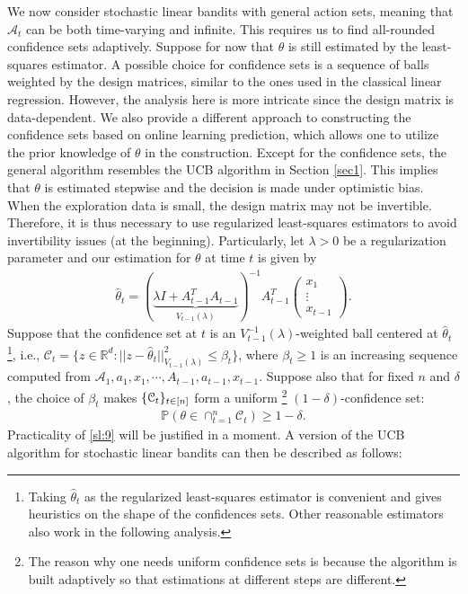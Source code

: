 \documentclass[letterpaper,11pt,openright,openany]{book}
\numberwithin{equation}{section}
\theoremstyle{plain}
\theoremstyle{definition}
\def\R{{\mathbb R}}
\def\R{{\mathbb R}}
\def\P{{\mathbb P}}
\def\t{{\theta}}
\begin{document}
We now consider stochastic linear bandits with general action sets, meaning that $\mathcal A_t$ can be both time-varying and infinite.
This requires us to find all-rounded confidence sets adaptively.  
Suppose for now that $\t$ is still estimated by the least-squares estimator. 
A possible choice for confidence sets is a sequence of balls weighted by the design matrices, similar to the ones used in the classical linear regression.
However, the analysis here is more intricate since the design matrix is data-dependent.  
We also provide a different approach to constructing the confidence sets based on online learning prediction, which allows one to utilize the prior knowledge of $\t$ in the construction. 
Except for the confidence sets, the general algorithm resembles the UCB algorithm in Section \ref{sec1}. 
This implies that $\t$ is estimated stepwise and the decision is made under optimistic bias. 
When the exploration data is small, the design matrix may not be invertible.  
Therefore, it is thus necessary to use regularized least-squares estimators to avoid invertibility issues (at the beginning). Particularly, let $\lambda>0$ be a regularization parameter and our estimation for $\t$ at time $t$ is given by 
\begin{align}\label{est}
\hat{\t}_t = (\underbrace{\lambda I +A^T_{t-1}A_{t-1}}_{V_{t-1}(\lambda)})^{-1}A^T_{t-1}\begin{pmatrix}
x_1 \\
\vdots \\
x_{t-1}
\end{pmatrix}.
\end{align}
Suppose that the confidence set at $t$ is an $V^{-1}_{t-1}(\lambda)$-weighted ball centered at $\hat{\t}_t$\footnote{Taking $\hat{\t}_t$ as the regularized least-squares estimator is convenient and gives heuristics on the shape of the confidences sets. Other reasonable estimators also work in the following analysis.}, i.e., $\mathcal C_t = \{z\in\R^d: ||z-\hat{\t}_t||^2_{V_{t-1}(\lambda)}\leq\beta_t\}$, where $\beta_t\geq 1$ is an increasing sequence computed from $\mathcal A_1, a_1, x_1, \cdots, A_{t-1}, a_{t-1}, x_{t-1}$. Suppose also that for fixed $n$ and $\delta$, the choice of $\beta_t$ makes $\mathcal \{\mathcal C_t\}_{t\in [n]}$ form a uniform \footnote{The reason why one needs uniform confidence sets is because the algorithm is built adaptively so that estimations at different steps are different.} $(1-\delta)$-confidence set:
\begin{align}
\P(\t\in\cap_{t=1}^n\mathcal C_t)\geq 1-\delta.\label{sl:9}
\end{align} 
Practicality of \eqref{sl:9} will be justified in a moment. A version of the UCB algorithm for stochastic linear bandits can then be described as follows:
\end{document}
